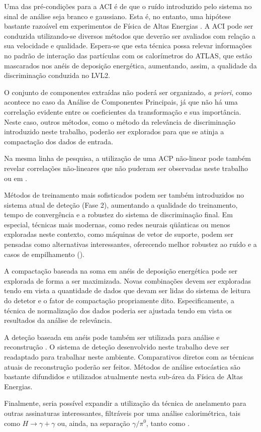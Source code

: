 Uma das pré-condições para a ACI é de que o ruído introduzido pelo sistema no
sinal de análise seja branco e gaussiano. Esta é, no entanto, uma hipótese
bastante razoável em experimentos de Física de Altas Energias \cite{knoll,
leo}. A ACI pode ser conduzida utilizando-se diversos métodos que deverão ser
avaliados com relação a sua velocidade e qualidade. Espera-se que esta técnica
possa relevar informações no padrão de interação das partículas com os
calorímetros do ATLAS, que estão mascarados nos anéis de deposição energética,
aumentando, assim, a qualidade da discriminação conduzida no LVL2.

O conjunto de componentes extraídas não poderá ser organizado, \textit{a
priori}, como acontece no caso da Análise de Componentes Principais, já que
não há uma correlação evidente entre os coeficientes da transformação e sua
importância. Neste caso, outros métodos, como o método da relevância de
discriminação introduzido neste trabalho, poderão ser explorados para que se
atinja a compactação dos dados de entrada.

Na mesma linha de pesquisa, a utilização de uma ACP não-linear pode também
revelar correlações não-lineares que não puderam ser observadas neste trabalho
ou em \cite{herman}.

Métodos de treinamento mais sofisticados podem ser também introduzidos no
sistema atual de deteção (Fase 2), aumentando a qualidade do treinamento,
tempo de convergência e a robustez do sistema de discriminação final. Em
especial, técnicas mais modernas, como redes neurais qüânticas \cite{qnns} ou
menos exploradas neste contexto, como máquinas de vetor de suporte,
\cite{haykin} podem ser pensadas como alternativas interessantes, oferecendo
melhor robustez ao ruído e a casos de empilhamento ().

A compactação baseada na soma em anéis de deposição energética pode ser
explorada de forma a ser maximizada. Novas combinações devem ser exploradas
tendo em vista a quantidade de dados que devam ser lidas do sistema de
leitura do detetor e o fator de compactação propriamente dito. Especificamente,
a técnica de normalização dos dados poderia ser ajustada tendo em vista os
resultados da análise de relevância.

A deteção baseada em anéis pode também ser utilizada para análise e
reconstrução . O sistema de deteção desenvolvido neste trabalho
deve ser readaptado para trabalhar neste ambiente. Comparativos diretos com as
técnicas atuais de reconstrução poderão ser feitos. Métodos de análise
estocástica são bastante difundidos e utilizados atualmente nesta sub-área da
Física de Altas Energias.

Finalmente, seria possível expandir a utilização da técnica de anelamento para
outras assinaturas interessantes, filtráveis por uma análise calorimétrica,
tais como $H \rightarrow \gamma + \gamma$ ou, ainda, na separação
$\gamma/\pi^0$, tanto  como .

